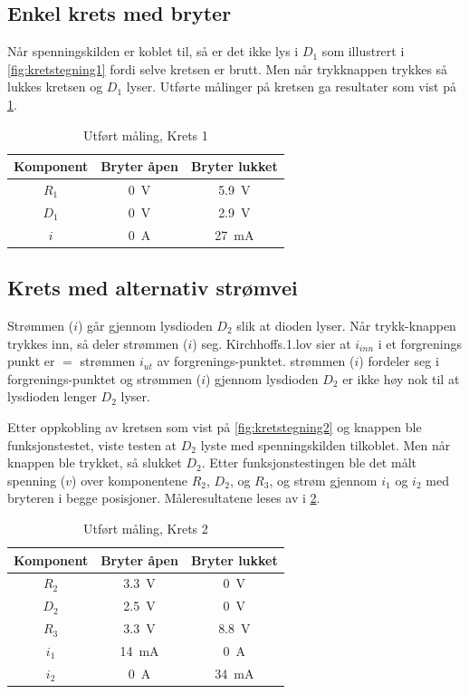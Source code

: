 \documentclass[11pt,a4paper,twocolumn]{article}
\begin{document}
\subsection{Enkel krets med bryter}
Når spenningskilden er koblet til, så er det ikke lys i $D_1$ som illustrert i \cref{fig:kretstegning1} fordi selve kretsen er brutt. Men når trykknappen trykkes så lukkes kretsen og $D_1$ lyser. Utførte målinger på kretsen ga resultater som vist på \cref{tab:krets1_resultater}.
\begin{table}[h]
	\centering
	\setlength{\belowcaptionskip}{6pt}
	\caption{Utført måling, Krets 1}
	\label{tab:krets1_resultater}
	\noindent
	\begin{tabular}{@{}ccc@{}}
		\hline
		Komponent & Bryter åpen & Bryter lukket \\
		\hline
		$R_1$ & \qty{0}{\volt} & \qty{5,9}{\volt}\\
		$D_1$ & \qty{0}{\volt} & \qty{2,9}{\volt}\\
		$i$ & \qty{0}{\ampere} & \qty{27}{\milli\ampere}\\
		\hline
	\end{tabular}
\end{table}

\subsection{Krets med alternativ strømvei}
Strømmen ($i$) går gjennom lysdioden $D_2$ slik at dioden lyser. Når trykk-knappen trykkes inn, så deler strømmen ($i$) seg. Kirchhoffs.1.lov sier at $i_{inn}$ i et forgrenings punkt  er $=$  strømmen $i_{ut}$ av forgrenings-punktet. strømmen ($i$) fordeler seg i forgrenings-punktet og strømmen ($i$) gjennom lysdioden $D_2$ er ikke høy nok til at lysdioden lenger $D_2$ lyser. 

Etter oppkobling av kretsen som vist på \cref{fig:kretstegning2} og knappen ble funksjonstestet, viste testen at $D_2$ lyste med spenningskilden tilkoblet. Men når knappen ble trykket, så slukket $D_2$. Etter funksjonstestingen ble det målt spenning ($v$) over komponentene $R_2$, $D_2$, og $R_3$, og strøm gjennom $i_1$ og $i_2$ med bryteren i begge posisjoner. Måleresultatene leses av i \cref{tab:krets2_resultater}.

\begin{table}[h]
	\centering
	\setlength{\belowcaptionskip}{6pt}
	\caption{Utført måling, Krets 2}
	\label{tab:krets2_resultater}
	\noindent
	\begin{tabular}{@{}ccc@{}}
		\hline
		Komponent & Bryter åpen & Bryter lukket \\
		\hline
		$R_2$ & \qty{3,3}{\volt} & \qty{0}{\volt}\\
		$D_2$ & \qty{2,5}{\volt} & \qty{0}{\volt}\\
		$R_3$ & \qty{3,3}{\volt} & \qty{8,8}{\volt}\\
		$i_1$ & \qty{14}{\milli\ampere} & \qty{0}{\ampere}\\
		$i_2$ & \qty{0}{\ampere} & \qty{34}{\milli\ampere}\\
		\hline
	\end{tabular}
\end{table}
\end{document}
